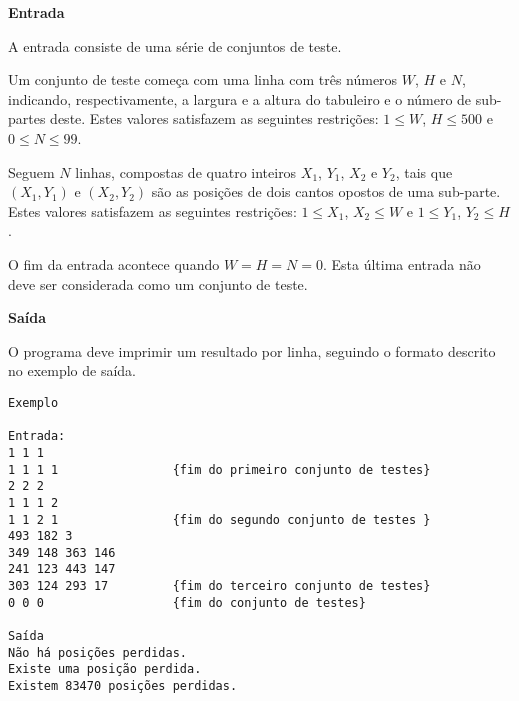\begin{enumerate}
\begin{center}
\textbf{Entrada}
\end{center}


A entrada consiste de uma série de conjuntos de teste. 

Um conjunto de teste começa com uma linha com três números $W$, $H$ e $N$, 
indicando, respectivamente, a largura e a altura do tabuleiro 
e o número de sub-partes deste. 
%
Estes valores satisfazem as seguintes restrições: 
$1 \leq W$, $H \leq 500$ e $0 \leq N \leq 99$. 

Seguem $N$ linhas, compostas de quatro inteiros 
$X_1$, $Y_1$, $X_2$ e $Y_2$, 
tais que $(X_1, Y_1)$ e $(X_2, Y_2)$ 
são as posições de dois cantos opostos de uma sub-parte. 
%
Estes valores satisfazem as seguintes restrições: 
$1 \leq X_1$, $X_2 \leq W$ e $1 \leq Y_1$, $Y_2 \leq H$. 

O fim da entrada acontece quando $W=H=N=0$. 
Esta última entrada não deve ser considerada como um conjunto de teste.

\begin{center}
\textbf{Saída}
\end{center}

O programa deve imprimir um resultado por linha, seguindo o formato 
descrito no exemplo de saída.

\begin{verbatim}
Exemplo

Entrada:
1 1 1
1 1 1 1                {fim do primeiro conjunto de testes}
2 2 2
1 1 1 2
1 1 2 1                {fim do segundo conjunto de testes }
493 182 3
349 148 363 146
241 123 443 147
303 124 293 17         {fim do terceiro conjunto de testes}
0 0 0                  {fim do conjunto de testes}

Saída
Não há posições perdidas. 
Existe uma posição perdida.
Existem 83470 posições perdidas.
\end{verbatim}


\end{enumerate}

